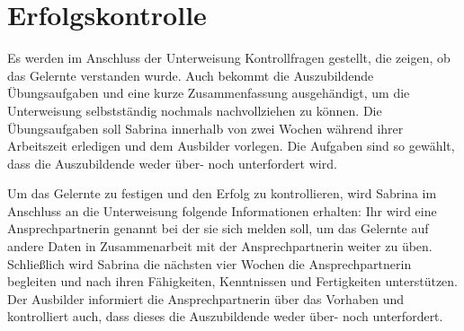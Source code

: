 \section{Erfolgskontrolle}\label{kap3:erfolg}
Es werden im Anschluss der Unterweisung Kontrollfragen gestellt, die zeigen, ob das Gelernte verstanden wurde. Auch bekommt die Auszubildende Übungsaufgaben und eine kurze Zusammenfassung ausgehändigt, um die Unterweisung selbstständig nochmals nachvollziehen zu können. Die Übungsaufgaben soll Sabrina innerhalb von zwei Wochen während ihrer Arbeitszeit erledigen und dem Ausbilder vorlegen. Die Aufgaben sind so gewählt, dass die Auszubildende weder über- noch unterfordert wird.
\par
Um das Gelernte zu festigen und den Erfolg zu kontrollieren, wird Sabrina im Anschluss an die Unterweisung folgende Informationen erhalten: Ihr wird eine Ansprechpartnerin genannt bei der sie sich melden soll, um das Gelernte auf andere Daten in Zusammenarbeit mit der Ansprechpartnerin weiter zu üben. Schließlich wird Sabrina die nächsten vier Wochen die Ansprechpartnerin begleiten und nach ihren Fähigkeiten, Kenntnissen und Fertigkeiten unterstützen. Der Ausbilder informiert die Ansprechpartnerin über das Vorhaben und kontrolliert auch, dass dieses die Auszubildende weder über- noch unterfordert. 


